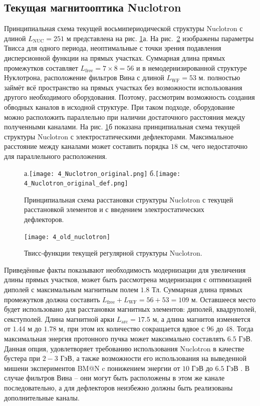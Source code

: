 	\subsection{Текущая магнитооптика Nuclotron}\label{sec:EDM/optics}
\par Принципиальная схема текущей восьмипериодической структуры Nuclotron с длиной $L_{\text{NUC}}=251$ м представлена на рис. \ref{fig:4_Nuclotron_original}а. На рис.~\ref{fig:4_old_nuclotron} изображены параметры Твисса для одного периода, неоптимальные с точки зрения подавления дисперсионной функции на прямых участках. Суммарная длина прямых промежутков составляет $L_{\text{free}} = 7\times8=56$ и в немодернизированной структуре Нуклотрона, расположение фильтров Вина с длиной $L_{\text{WF}} = 53$ м. полностью займёт всё пространство на прямых участках без возможности использования другого необходимого оборудования. Поэтому, рассмотрим возможность создания обводных каналов в исходной структуре. При таком подходе, оборудование можно расположить параллельно при наличии достаточного расстояния между полученными каналами. На рис. \ref{fig:4_Nuclotron_original}б показана принципиальная схема текущей структуры Nuclotron с электростатическими дефлекторами. Максимальное расстояние между каналами может составить порядка $18$ см, чего недостаточно для параллельного расположения.

\begin{figure}[!h]
	\centering
	а.\texttt{[image: 4\_Nuclotron\_original.png]}
	б.\texttt{[image: 4\_Nuclotron\_original\_def.png]}
	\caption{Принципиальная схема расстановки структуры Nuclotron с текущей расстановкой элементов и с введением электростатических дефлекторов.}
	\label{fig:4_Nuclotron_original}
\end{figure}

\begin{figure}[!h]
  \centering
	\texttt{[image: 4\_old\_nuclotron]}
   \caption{Твисс-функции текущей регулярной структуры Nuclotron.}
   \label{fig:4_old_nuclotron}
\end{figure}

\par Приведённые факты показывают необходимость модернизации для увеличения длины прямых участков, может быть рассмотрена модернизация с оптимизацией диполей с максимальным магнитным полем $1.8$ Тл. Суммарная длина прямых промежутков должна составить $L_{\text{free}}+L_{\text{WF}}=56+53 = 109$ м. Оставшееся место будет использовано для расстановки магнитных элементов: диполей, квадруполей, секступолей. Длина магнитной арки $L_{\textrm{arc}}=17.5$ м, а длина магнитов изменяется от $1.44$ м до $1.78$ м, при этом их количество сокращается вдвое с $96$ до $48$. Тогда максимальная энергия протонного пучка может максимально составлять $6.5$ ГэВ. Данная опция, удовлетворяет требованию использования Nuclotron в качестве бустера при $2-3$ ГэВ, а также возможности его использования на выведенной мишени экспериментов BM@N c понижением энергии от $10$ ГэВ до $6.5$ ГэВ \cite{kovalenko:nuclotron}. В случае фильтров Вина – они могут быть расположены в этом же канале последовательно, а для дефлекторов неизбежно должны быть реализованы дополнительные каналы.

